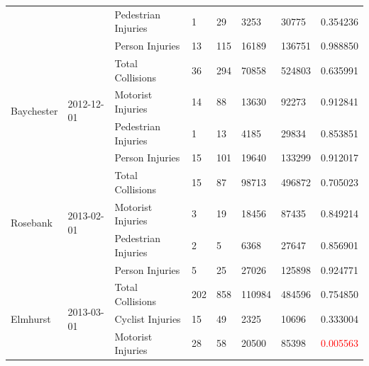 \documentclass[10pt,journal,compsoc]{IEEEtran}
\begin{document}
\begin{table}[]
\begin{tabular}{|l|l|l|l|l|l|l|l|}
                                               &                             & Pedestrian Injuries & 1         & 29       & 3253       & 30775     & 0.354236 \\ \cline{3-8} 
                                               &                             & Person Injuries     & 13        & 115      & 16189      & 136751    & 0.988850 \\ \hline
\multirow{4}{*}{Baychester}                    & \multirow{4}{*}{2012-12-01} & Total Collisions    & 36        & 294      & 70858      & 524803    & 0.635991 \\ \cline{3-8} 
                                               &                             & Motorist Injuries   & 14        & 88       & 13630      & 92273     & 0.912841 \\ \cline{3-8} 
                                               &                             & Pedestrian Injuries & 1         & 13       & 4185       & 29834     & 0.853851 \\ \cline{3-8} 
                                               &                             & Person Injuries     & 15        & 101      & 19640      & 133299    & 0.912017 \\ \hline
\multirow{4}{*}{Rosebank}                      & \multirow{4}{*}{2013-02-01} & Total Collisions    & 15        & 87       & 98713      & 496872    & 0.705023 \\ \cline{3-8} 
                                               &                             & Motorist Injuries   & 3         & 19       & 18456      & 87435     & 0.849214 \\ \cline{3-8} 
                                               &                             & Pedestrian Injuries & 2         & 5        & 6368       & 27647     & 0.856901 \\ \cline{3-8} 
                                               &                             & Person Injuries     & 5         & 25       & 27026      & 125898    & 0.924771 \\ \hline
\multirow{5}{*}{Elmhurst}                      & \multirow{5}{*}{2013-03-01} & Total Collisions    & 202       & 858      & 110984     & 484596    & 0.754850 \\ \cline{3-8} 
                                               &                             & Cyclist Injuries    & 15        & 49       & 2325       & 10696     & 0.333004 \\ \cline{3-8} 
                                               &                             & Motorist Injuries   & 28        & 58       & 20500      & 85398     & \textcolor{red}{0.005563} \\ \cline{3-8} 

\end{tabular}
\end{table}
\end{document}
